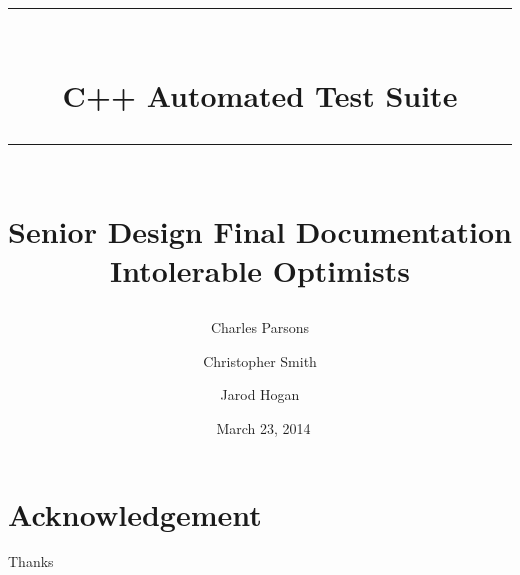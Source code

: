 \documentclass{book}
\title{{\color{MSBlue1} \rule{\linewidth}{0.5mm}}\\[2mm] {\huge \bfseries \color{MSBlue1} C++ Automated Test Suite }\\[-1mm] {\color{MSBlue1}\rule{\linewidth}{0.5mm}} \\  \vfill
{\LARGE \bfseries \color{MSBlue2} Senior Design Final Documentation }\\  \vfill 
{\color{MSBlue1} Intolerable Optimists} }
\author{\color{MSBlue1}  Charles Parsons \and \color{MSBlue1} Christopher Smith \and  \color{MSBlue1} Jarod Hogan }
\date{\color{MSBlue1} \ March 23, 2014}
\begin{document}
\frontmatter
\maketitle


\tableofcontents
\listoffigures

\listoftables
\listofalgorithms



 
\mainmatter













\backmatter
\chapter{Acknowledgement}
\label{SpecialThanks}  Thanks  


\setcounter{section}{0}



\setcounter{section}{0}





\end{document}
